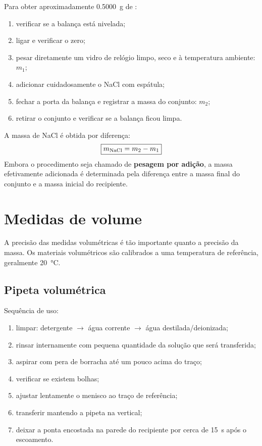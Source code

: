 \documentclass[a4paper,12pt]{article}
\begin{document}
\begin{procedimento}
Para obter aproximadamente \SI{0.5000}{\gram} de :
\begin{enumerate}[leftmargin=1.7em]
    \item verificar se a balança está nivelada;
    \item ligar e verificar o zero;
    \item pesar diretamente um vidro de relógio limpo, seco e à temperatura ambiente: $m_1$;
    \item adicionar cuidadosamente o NaCl com espátula;
    \item fechar a porta da balança e registrar a massa do conjunto: $m_2$;
    \item retirar o conjunto e verificar se a balança ficou limpa.
\end{enumerate}
\end{procedimento}

\begin{conta}
A massa de NaCl é obtida por diferença:
\[
\boxed{m_{\ce{NaCl}} = m_2 - m_1}
\]
Embora o procedimento seja chamado de \textbf{pesagem por adição}, a massa efetivamente adicionada é determinada pela diferença entre a massa final do conjunto e a massa inicial do recipiente.
\end{conta}

\section{Medidas de volume}

A precisão das medidas volumétricas é tão importante quanto a precisão da massa. Os materiais volumétricos são calibrados a uma temperatura de referência, geralmente \SI{20}{\degreeCelsius}.

\subsection{Pipeta volumétrica}

\begin{procedimento}
Sequência de uso:
\begin{enumerate}[leftmargin=1.7em]
    \item limpar: detergente $\rightarrow$ água corrente $\rightarrow$ água destilada/deionizada;
    \item rinsar internamente com pequena quantidade da solução que será transferida;
    \item aspirar com pera de borracha até um pouco acima do traço;
    \item verificar se existem bolhas;
    \item ajustar lentamente o menisco ao traço de referência;
    \item transferir mantendo a pipeta na vertical;
    \item deixar a ponta encostada na parede do recipiente por cerca de \SI{15}{\second} após o escoamento.
\end{enumerate}
\end{procedimento}
\end{document}
